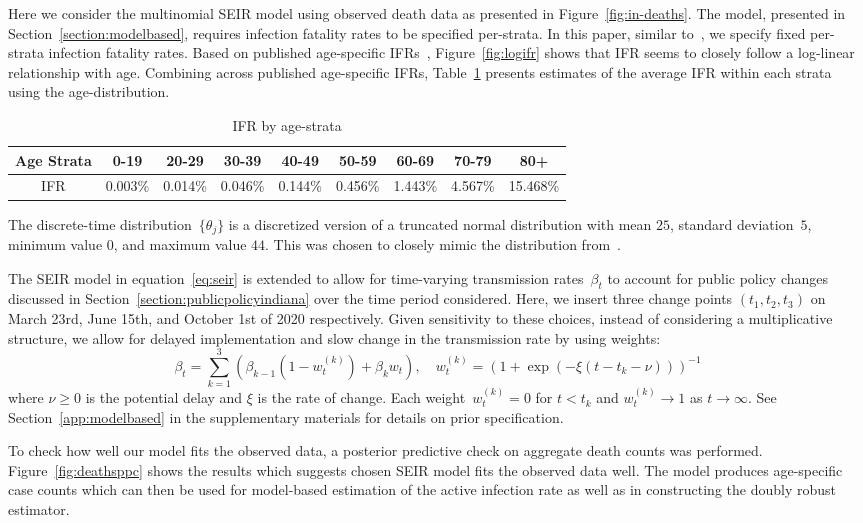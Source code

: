 \documentclass[11pt]{amsart}
\numberwithin{equation}{section}
\theoremstyle{plain}
\begin{document}
Here we consider the multinomial SEIR model using observed death data as presented in Figure~\ref{fig:in-deaths}. The model, presented in Section~\ref{section:modelbased}, requires infection fatality rates to be specified per-strata.  In this paper, similar to~\cite{Johndrow2020}, we specify fixed per-strata infection fatality rates. Based on published age-specific IFRs~\cite{Levin2020}, Figure~\ref{fig:logifr} shows that IFR seems to closely follow a log-linear relationship with age. Combining across published age-specific IFRs, Table~\ref{tab:ifrperage} presents estimates of the average IFR within each strata using the age-distribution.
\begin{table}[!th]
\begin{tabular}{c | c c c c c c c c}
Age Strata & 0-19 & 20-29 & 30-39 & 40-49 & 50-59 & 60-69 & 70-79 & 80+ \\ \hline
IFR & 0.003\% & 0.014\% & 0.046\% & 0.144\% & 0.456\% & 1.443\% & 4.567\% & 15.468\%
\end{tabular}
\caption{IFR by age-strata}
\label{tab:ifrperage}
\end{table}
The discrete-time distribution~$\{ \theta_{j} \}$ is a discretized version of a truncated normal distribution with mean $25$, standard deviation~$5$, minimum value $0$, and maximum value $44$.  This was chosen to closely mimic the distribution from~\cite{Johndrow2020}.

The SEIR model in equation~\eqref{eq:seir} is extended to allow for time-varying transmission rates~$\beta_t$ to account for public policy changes discussed in Section~\ref{section:publicpolicyindiana} over the time period considered.  Here, we insert three change points $(t_1,t_2,t_3)$ on March 23rd, June 15th, and October 1st of 2020 respectively.  Given sensitivity to these choices, instead of considering a multiplicative structure, we allow for delayed implementation and slow change in the transmission rate by using weights:
$$
\beta_t = \sum_{k=1}^{3} \left(\beta_{k-1} (1-w^{(k)}_t ) + \beta_{k} w_t\right),\quad w^{(k)}_t = (1 + \exp \left( -\xi (t - t_k - \nu) \right))^{-1}
$$
where $\nu \geq 0$ is the potential delay and $\xi$ is the rate of change.  Each weight~$w_t^{(k)} = 0$ for $t < t_k$ and $w_t^{(k)} \to 1$ as $t \to \infty$. See Section~\ref{app:modelbased} in the supplementary materials for details on prior specification.

To check how well our model fits the observed data, a posterior predictive check on aggregate death counts was performed. Figure~\ref{fig:deathsppc} shows the results which suggests chosen SEIR model fits the observed data well.  The model produces age-specific case counts which can then be used for model-based estimation of the active infection rate as well as in constructing the doubly robust estimator.
\end{document}
